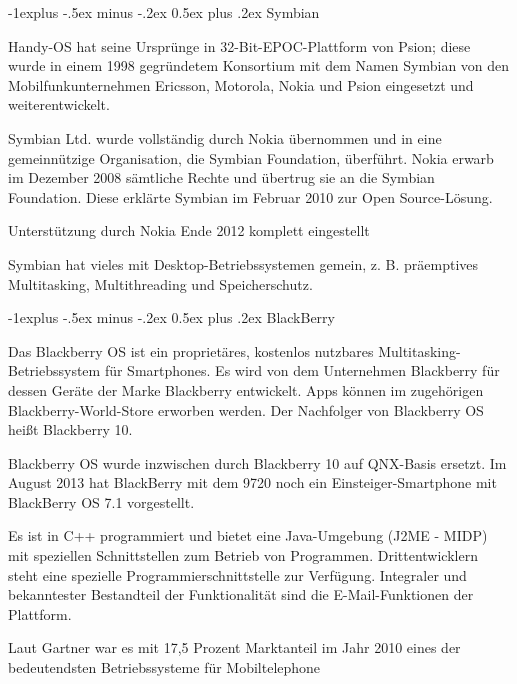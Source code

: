 \documentclass[a4paper]{article}
\makeatletter
\renewcommand{\subsection}{\@startsection{subsection}{2}{0mm}%
                                {-1explus -.5ex minus -.2ex}%
                                {0.5ex plus .2ex}%
                                {\normalfont\normalsize\bfseries}}
\makeatother
\begin{document}
\begin{multicols*}{2}
  \subsection{Symbian}
  \begin{itemize*}
    \item Handy-OS hat seine Ursprünge in 32-Bit-EPOC-Plattform von Psion; diese wurde in einem 1998 gegründetem Konsortium mit dem Namen Symbian von den Mobilfunkunternehmen Ericsson, Motorola, Nokia und Psion eingesetzt und weiterentwickelt.
    \item Symbian Ltd. wurde vollständig durch Nokia übernommen und in eine gemeinnützige Organisation, die Symbian Foundation, überführt. Nokia erwarb im Dezember 2008 sämtliche Rechte und übertrug sie an die Symbian Foundation. Diese erklärte Symbian im Februar 2010 zur Open Source-Lösung.
    \item Unterstützung durch Nokia Ende 2012 komplett eingestellt
    \item Symbian hat vieles mit Desktop-Betriebssystemen gemein, z. B. präemptives Multitasking, Multithreading und Speicherschutz.
  \end{itemize*}

  \subsection{BlackBerry}
  \begin{itemize*}
    \item Das Blackberry OS ist ein proprietäres, kostenlos nutzbares Multitasking-Betriebssystem für Smartphones. Es wird von dem Unternehmen Blackberry für dessen Geräte der Marke Blackberry entwickelt. Apps können im zugehörigen Blackberry-World-Store erworben werden. Der Nachfolger von Blackberry OS heißt Blackberry 10.
    \item Blackberry OS wurde inzwischen durch Blackberry 10 auf QNX-Basis ersetzt. Im August 2013 hat BlackBerry mit dem 9720 noch ein Einsteiger-Smartphone mit BlackBerry OS 7.1 vorgestellt.
    \item Es ist in C++ programmiert und bietet eine Java-Umgebung (J2ME - MIDP) mit speziellen Schnittstellen zum Betrieb von Programmen. Drittentwicklern steht eine spezielle Programmierschnittstelle zur Verfügung. Integraler und bekanntester Bestandteil der Funktionalität sind die E-Mail-Funktionen der Plattform.
    \item Laut Gartner war es mit 17,5 Prozent Marktanteil im Jahr 2010 eines der bedeutendsten Betriebssysteme für Mobiltelephone
  \end{itemize*}


\end{multicols*}
\end{document}
